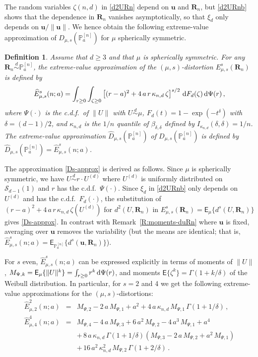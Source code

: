 \documentclass{article}
\def\Ex{\mathsf{E}}
\def\simd{\stackrel{d}{\sim}}
\def\PP{\mathbb{P}}
\def\SS{{\mathcal S}}
\newcommand{\be}{\begin{eqnarray}}
\newcommand{\ee}{\end{eqnarray}}
\def\Rb{\mathbf{R}}
\def\ub{\mathbf{u}}
\def\dd{\mbox{\rm d}}
\newtheorem{definition}{Definition}[section]
\begin{document}
The random variables $\zeta(n,d)$ in \eqref{d2URn} depend on $\ub$ and $\Rb_n$, but \eqref{d2URnb} shows that the dependence in $\Rb_n$ vanishes asymptotically, so that $\xi_d$ only depends on $\ub/\|\ub\|$. We hence obtain the following extreme-value approximation of $D_{\mu,s}(\PP_a^{[n]})$ for $\mu$ spherically symmetric.

\begin{definition}\label{D:main-extreme-value}
Assume that $d\geq 3$ and that $\mu$ is spherically symmetric. For any $\Rb_n\simd \PP_a^{[n]}$, the extreme-value approximation of the $(\mu,s)$-distortion $E_{\mu,s}^s(\Rb_n)$ is defined by
\be\label{Ds-approx}
\widehat E_{\mu,s}^s(n;a) = \int_{r\geq 0} \int_{\zeta\geq 0} \left[(r-a)^2 + 4\,a\,r\,\kappa_{n,d}\,\zeta\right]^{s/2}\, \dd F_d(\zeta) \, \dd \Psi(r) \,,
\ee
where $\Psi(\cdot)$ is the c.d.f.\ of $\|U\|$ with $U\simd \mu$, $F_d(t)=1-\exp(-t^\delta)$ with $\delta=(d-1)/2$, and $\kappa_{n,d}$ is the $1/n$ quantile of $\beta_{\delta,\delta}$ defined by $I_{\kappa_{n,d}}(\delta,\delta)=1/n$. The extreme-value approximation $\widehat D_{\mu,s}(\PP_a^{[n]})$ of $D_{\mu,s}(\PP_a^{[n]})$ is defined by $\widehat D_{\mu,s}(\PP_a^{[n]})=\widehat E_{\mu,s}^s(n;a)$.
\end{definition}

The approximation \eqref{Ds-approx} is derived as follows. Since $\mu$ is spherically symmetric, we have $U\simd r\cdot U^{(d)}$ where $U^{(d)}$ is uniformly distributed on $\SS_{d-1}(1)$ and $r$ has the c.d.f.\ $\Psi(\cdot)$. Since $\xi_d$ in \eqref{d2URnb} only depends on $U^{(d)}$ and has the c.d.f.\ $F_d(\cdot)$, the substitution of $(r-a)^2 + 4\,a\,r\,\kappa_{n,d}\,\zeta(U^{(d)})$ for $d^2(U,\Rb_n)$ in $E_{\mu,s}^s(\Rb_n)= \Ex_\mu \{d^s(U,\Rb_n)\}$ gives \eqref{Ds-approx}. In contrast with Remark~\ref{R:moments-duRn} where $\ub$ is fixed, averaging over $\ub$ removes the variability (but the means are identical; that is, $\widehat E_{\mu,s}^s(n;a)=\Ex_{\PP_a^{[n]}}\{d^s(\ub,\Rb_n)\}$).

For $s$ even, $\widehat E_{\mu,s}^s(n;a)$ can be expressed explicitly in terms of moments of $\|U\|$, $M_{\Psi,k}=\Ex_\mu\{\|U\|^k\}=\int_{r\geq 0}  r^k\,\dd \Psi(r)$, and moments $\Ex\{\zeta^k\}=\Gamma(1+k/\delta)$ of the Weibull distribution. In particular, for $s=2$ and 4 we get the following extreme-value approximations for the $(\mu,s)$-distortions:
\be
\widehat E_{\mu,2}^2(n;a) &=& M_{\Psi,2} - 2\,a\,M_{\Psi,1}+a^2 + 4\,a\,\kappa_{n,d}\,M_{\Psi,1}\,\Gamma(1+1/\delta)  \,, \label{E2^2-general}\\
\widehat E_{\mu,4}^4(n;a) &=& M_{\Psi,4} - 4\,a\,M_{\Psi,3}+6\,a^2\,M_{\Psi,2}-4\,a^3\,M_{\Psi,1}+a^4 \nonumber \\
&& + \, 8\,a\,\kappa_{n,d}\,\Gamma(1+1/\delta)
\left( M_{\Psi,3} - 2\,a\,M_{\Psi,2}+a^2\,M_{\Psi,1} \right) \nonumber \\
&& + \, 16\,a^2\,\kappa_{n,d}^2\,M_{\Psi,2}\,\Gamma(1+2/\delta) \,. \label{E4^2-general}
\ee
\end{document}
